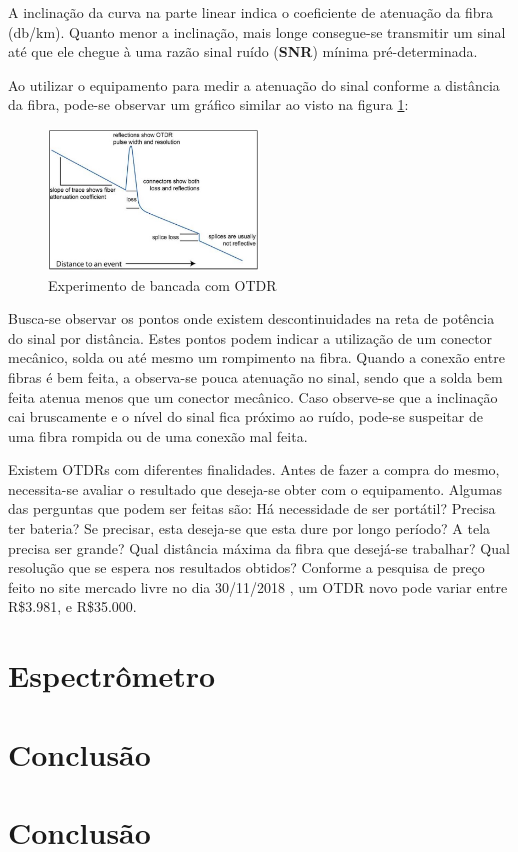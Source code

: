 \documentclass[article]{IEEEtran}
\begin{document}
A inclinação da curva na parte linear indica o coeficiente de atenuação da fibra (db/km). Quanto menor a inclinação, mais longe consegue-se transmitir um sinal até que ele chegue à uma razão sinal ruído (\textbf{SNR}) mínima pré-determinada.

Ao utilizar o equipamento para medir a atenuação do sinal conforme a distância da fibra, pode-se observar um gráfico similar ao visto na figura \ref{fig:OTDR_grafico}:
\begin{figure}[H]
	\includegraphics[width=0.5\textwidth]{images/OTDR_grafico.JPG}
	\caption{Experimento de bancada com OTDR}
	\label{fig:OTDR_grafico}
\end{figure} 

Busca-se observar os pontos onde existem descontinuidades na reta de potência do sinal por distância. Estes pontos podem indicar a utilização de um conector mecânico, solda ou até mesmo um rompimento na fibra. Quando a conexão entre fibras é bem feita, a observa-se pouca atenuação no sinal, sendo que a solda bem feita atenua menos que um conector mecânico. Caso observe-se que a inclinação cai bruscamente e o nível do sinal fica próximo ao ruído, pode-se suspeitar de uma fibra rompida ou de uma conexão mal feita.

Existem OTDRs com diferentes finalidades. Antes de fazer a compra do mesmo, necessita-se avaliar o resultado que deseja-se obter com o equipamento. Algumas das perguntas que podem ser feitas são: Há necessidade de ser portátil? Precisa ter bateria? Se precisar, esta deseja-se que esta dure por longo período? A tela precisa ser grande? Qual distância máxima da fibra que desejá-se trabalhar? Qual resolução que se espera nos resultados obtidos? Conforme a pesquisa de preço feito no site mercado livre no dia 30/11/2018 \cite{M_LIVRE}, um OTDR novo pode variar entre R\$3.981, e R\$35.000.

\section{Espectrômetro}


\section{Conclusão}




\section{Conclusão}
\end{document}
